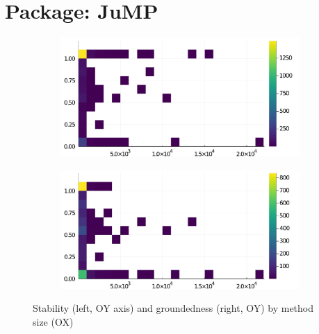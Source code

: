 \section*{Package: JuMP}
\begin{figure}[h]
     \begin{subfigure}[b]{0.49\textwidth}
       \includegraphics[width=\textwidth]{figs/all-package-graphs/JuMP-size-vs-stable.pdf}
     \end{subfigure}
     \begin{subfigure}[b]{0.49\textwidth}
       \includegraphics[width=\textwidth]{figs/all-package-graphs/JuMP-size-vs-grounded.pdf}
     \end{subfigure}
\caption{Stability (left, OY axis) and groundedness (right, OY) by method size (OX)}%
%
\label{figs:size:JuMP}
\end{figure}

